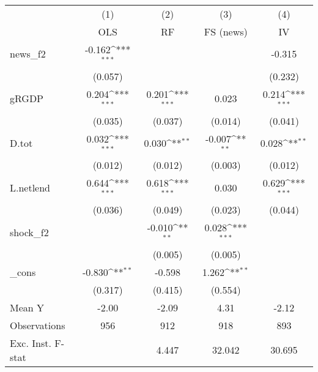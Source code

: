{
\def\sym#1{\ifmmode^{#1}\else\(^{#1}\)\fi}
\begin{tabular}{l*{4}{c}}
\toprule
            &\multicolumn{1}{c}{(1)}&\multicolumn{1}{c}{(2)}&\multicolumn{1}{c}{(3)}&\multicolumn{1}{c}{(4)}\\
            &\multicolumn{1}{c}{OLS}&\multicolumn{1}{c}{RF}&\multicolumn{1}{c}{FS (news)}&\multicolumn{1}{c}{IV}\\
\midrule
news\_f2     &      -0.162\sym{***}&                     &                     &      -0.315         \\
            &     (0.057)         &                     &                     &     (0.232)         \\
\addlinespace
gRGDP       &       0.204\sym{***}&       0.201\sym{***}&       0.023         &       0.214\sym{***}\\
            &     (0.035)         &     (0.037)         &     (0.014)         &     (0.041)         \\
\addlinespace
D.tot       &       0.032\sym{***}&       0.030\sym{**} &      -0.007\sym{**} &       0.028\sym{**} \\
            &     (0.012)         &     (0.012)         &     (0.003)         &     (0.012)         \\
\addlinespace
L.netlend   &       0.644\sym{***}&       0.618\sym{***}&       0.030         &       0.629\sym{***}\\
            &     (0.036)         &     (0.049)         &     (0.023)         &     (0.044)         \\
\addlinespace
shock\_f2    &                     &      -0.010\sym{**} &       0.028\sym{***}&                     \\
            &                     &     (0.005)         &     (0.005)         &                     \\
\addlinespace
\_cons      &      -0.830\sym{**} &      -0.598         &       1.262\sym{**} &                     \\
            &     (0.317)         &     (0.415)         &     (0.554)         &                     \\
\midrule
Mean Y      &       -2.00         &       -2.09         &        4.31         &       -2.12         \\
Observations&         956         &         912         &         918         &         893         \\
Exc. Inst. F-stat&                     &       4.447         &      32.042         &      30.695         \\
\bottomrule
\end{tabular}
}
